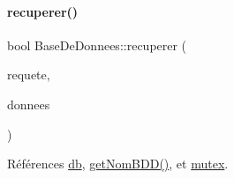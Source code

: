 \mbox{\label{class_base_de_donnees_a68dd0d62ba03b9e8e5aa759d0666cb59}} 
\paragraph{\texorpdfstring{recuperer()}{recuperer()}\hspace{0.1cm}{\footnotesize\ttfamily [4/4]}}
{\footnotesize\ttfamily bool Base\+De\+Donnees\+::recuperer (\begin{DoxyParamCaption}\item[{Q\+String}]{requete,  }\item[{Q\+Vector$<$ Q\+String\+List $>$ \&}]{donnees }\end{DoxyParamCaption})}



Références \hyperlink{class_base_de_donnees_a3e738dcf443370c46a541677ab619f06}{db}, \hyperlink{class_base_de_donnees_a467909531ae3cdebaf173f6e97cdc624}{get\+Nom\+B\+D\+D()}, et \hyperlink{class_base_de_donnees_aa1b4696fac87a740f914aa73739086f2}{mutex}.


